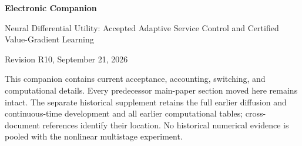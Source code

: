 \documentclass[11pt,letterpaper]{article}
\theoremstyle{definition}
\newcommand{\1}{\mathbf 1}
\begin{document}
\begin{center}{\Large\bfseries Electronic Companion\par}\medskip
{\large Neural Differential Utility: Accepted Adaptive Service Control and Certified Value-Gradient Learning\par}\medskip
Revision R10, September 21, 2026
\end{center}
This companion contains current acceptance, accounting, switching, and computational details. Every predecessor main-paper section moved here remains intact. The separate historical supplement retains the full earlier diffusion and continuous-time development and all earlier computational tables; cross-document references identify their location. No historical numerical evidence is pooled with the nonlinear multistage experiment.









\clearpage
\end{document}
